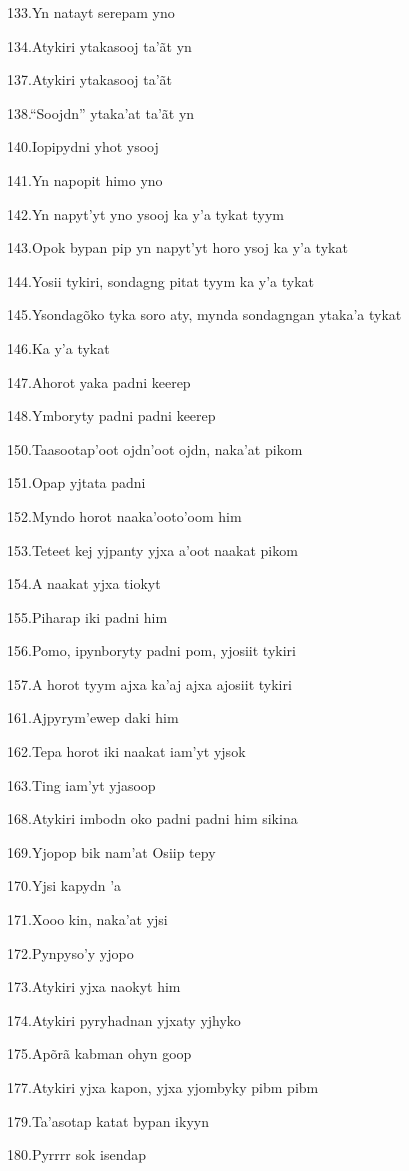 133.Yn natayt serepam yno

134.Atykiri ytakasooj ta'ãt yn

137.Atykiri ytakasooj ta'ãt

138.``Soojdn'' ytaka'at ta'ãt yn

140.Iopipydni yhot ysooj

141.Yn napopit himo yno

142.Yn napyt'yt yno ysooj ka y'a tykat tyym

143.Opok bypan pip yn napyt'yt horo ysoj ka y'a tykat

144.Yosii tykiri, sondagng pitat tyym ka y'a tykat

145.Ysondagõko tyka soro aty, mynda sondagngan ytaka'a tykat

146.Ka y'a tykat

147.Ahorot yaka padni keerep

148.Ymboryty padni padni keerep

150.Taasootap'oot ojdn'oot ojdn, naka'at pikom

151.Opap yjtata padni

152.Myndo horot naaka'ooto'oom him

153.Teteet kej yjpanty yjxa a'oot naakat pikom

154.A naakat yjxa tiokyt

155.Piharap iki padni him

156.Pomo, ipynboryty padni pom, yjosiit tykiri

157.A horot tyym ajxa ka'aj ajxa ajosiit tykiri

161.Ajpyrym'ewep daki him

162.Tepa horot iki naakat iam'yt yjsok

163.Ting iam'yt yjasoop

168.Atykiri imbodn oko padni padni him sikina

169.Yjopop bik nam'at Osiip tepy

170.Yjsi kapydn 'a

171.Xooo kin, naka'at yjsi

172.Pynpyso'y yjopo

173.Atykiri yjxa naokyt him

174.Atykiri pyryhadnan yjxaty yjhyko

175.Apõrã kabman ohyn goop

177.Atykiri yjxa kapon, yjxa yjombyky pibm pibm

179.Ta'asotap katat bypan ikyyn

180.Pyrrrr sok isendap

